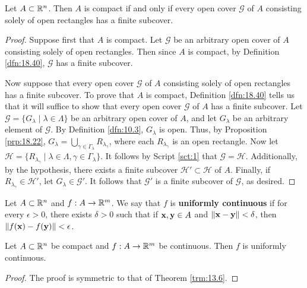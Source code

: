 \documentclass[../main.tex]{subfiles}
\begin{document}
\begin{proposition}\label{prp:18.41}
    Let $A\subset\mathbb{R}^n$. Then $A$ is compact if and only if every open cover $\mathcal{G}$ of $A$ consisting solely of open rectangles has a finite subcover.
    \begin{proof}
        Suppose first that $A$ is compact. Let $\mathcal{G}$ be an arbitrary open cover of $A$ consisting solely of open rectangles. Then since $A$ is compact, by Definition \ref{dfn:18.40}, $\mathcal{G}$ has a finite subcover.\par
        Now suppose that every open cover $\mathcal{G}$ of $A$ consisting solely of open rectangles has a finite subcover. To prove that $A$ is compact, Definition \ref{dfn:18.40} tells us that it will suffice to show that every open cover $\mathcal{G}$ of $A$ has a finite subcover. Let $\mathcal{G}=\{G_\lambda\mid\lambda\in\Lambda\}$ be an arbitrary open cover of $A$, and let $G_\lambda$ be an arbitrary element of $\mathcal{G}$. By Definition \ref{dfn:10.3}, $G_\lambda$ is open. Thus, by Proposition \ref{prp:18.22}, $G_\lambda=\bigcup_{\gamma\in\Gamma_\lambda}R_{\lambda_\gamma}$, where each $R_{\lambda_\gamma}$ is an open rectangle. Now let $\mathcal{H}=\{R_{\lambda_\gamma}\mid\lambda\in\Lambda,\gamma\in\Gamma_\lambda\}$. It follows by Script \ref{sct:1} that $\mathcal{G}=\mathcal{H}$. Additionally, by the hypothesis, there exists a finite subcover $\mathcal{H}'\subset\mathcal{H}$ of $A$. Finally, if $R_{\lambda_\gamma}\in\mathcal{H}'$, let $G_\lambda\in\mathcal{G}'$. It follows that $\mathcal{G}'$ is a finite subcover of $\mathcal{G}$, as desired.
    \end{proof}
\end{proposition}

\begin{definition}\label{dfn:18.42}
    Let $A\subset\mathbb{R}^n$ and $f:A\to\mathbb{R}^m$. We say that $f$ is \textbf{uniformly continuous} if for every $\epsilon>0$, there exists $\delta>0$ such that if $\mathbf{x},\mathbf{y}\in A$ and $\norm{\mathbf{x}-\mathbf{y}}<\delta$, then $\norm{f(\mathbf{x})-f(\mathbf{y})}<\epsilon$.
\end{definition}

\begin{theorem}\label{trm:18.43}
    Let $A\subset\mathbb{R}^n$ be compact and $f:A\to\mathbb{R}^m$ be continuous. Then $f$ is uniformly continuous.
    \begin{proof}
        The proof is symmetric to that of Theorem \ref{trm:13.6}.
    \end{proof}
\end{theorem}
\end{document}

